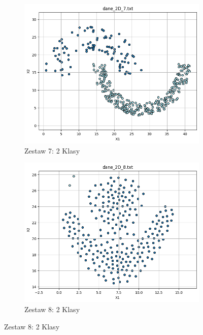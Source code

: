 \documentclass[polish,12pt,a4paper]{extarticle}
\begin{document}
\begin{figure}[h!]
    \centering
    \begin{subfigure}[b]{0.30\textwidth}
        \includegraphics[width=\linewidth]{img/spectral/singular/data7.png}
        \captionsetup{labelformat=empty}
        \caption{Zestaw 7: 2 Klasy}
    \end{subfigure}
    \begin{subfigure}[b]{0.30\textwidth}
        \includegraphics[width=\linewidth]{img/spectral/singular/data8.png}
        \captionsetup{labelformat=empty}
        \caption{Zestaw 8: 2 Klasy}
    \end{subfigure}
    \label{fig:data_grid}
\end{figure} \FloatBarrier
\end{document}
